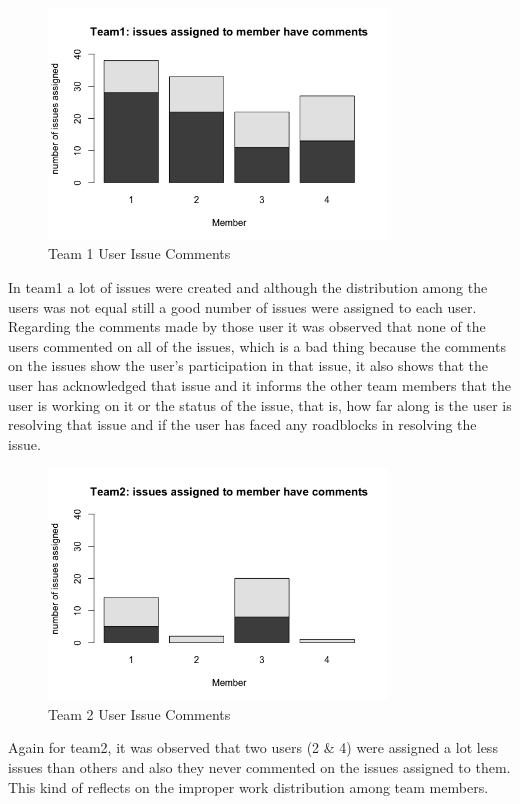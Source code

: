 \documentclass[conference]{IEEEtran}
\begin{document}
\begin{figure}[H]
    \centering
    \includegraphics[width=9cm]{../AprilProject/pic/team1_user_issue_comments.png}
    \caption{Team 1 User Issue Comments}
    \label{team1_issue_comment}
\end{figure}

In team1 a lot of issues were created and although the distribution among the users was not equal still a good number of issues were assigned to each user. Regarding the comments made by those user it was observed that none of the users commented on all of the issues, which is a bad thing because the comments on the issues show the user's participation in that issue, it also shows that the user has acknowledged that issue and it informs the other team members that the user is working on it or the status of the issue, that is, how far along is the user is resolving that issue and if the user has faced any roadblocks in resolving the issue.

\begin{figure}[H]
    \centering
    \includegraphics[width=9cm]{../AprilProject/pic/team2_user_issue_comments.png}
    \caption{Team 2 User Issue Comments}
    \label{team2_issue_comment}
\end{figure}

Again for team2, it was observed that two users (2 & 4) were assigned a lot less issues than others and also they never commented on the issues assigned to them. This kind of reflects on the improper work distribution among team members.
\end{document}
